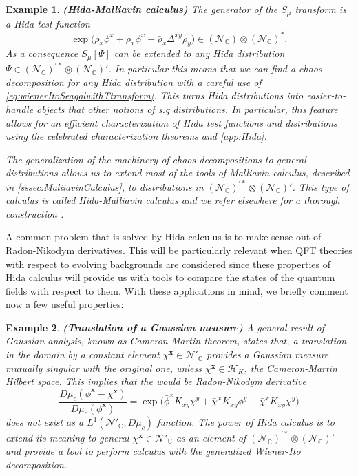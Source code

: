 \documentclass{elsarticle}%
\newtheorem{example}{Example}%
\begin{document}
\begin{example}{\bf (Hida-Malliavin calculus)}
    \label{ex:HidaMalliavin}
    The generator of the $S_\mu$ transform is a Hida test function
    $$\exp{\big(\overline{{\rho}_x\phi^x}+{\rho_x{\phi}^x}-\bar\rho_x\Delta^{xy}\rho_y\big)}\in (\mathcal{N}_\mathbb{C})\otimes (\mathcal{N}_\mathbb{C})^*.$$  As a consequence $S_\mu[\Psi]$ can be extended  to any Hida distribution $\Psi\in(\mathcal{N}_{\mathbb{C}})^{\prime \ast}\otimes (\mathcal{N}_\mathbb{C})'$. In particular this means that we can find a chaos decomposition for any Hida distribution with a careful use of \eqref{eq:wienerItoSeagalwithTtransform}.  
    This turns Hida distributions into easier-to-handle objects that other notions of \textit{s.q} distributions. In particular, this feature allows for an efficient characterization of Hida test functions and distributions using the celebrated characterization theorems \cite{kondratievGeneralizedFunctionals1996,hidaWhiteNoise1993} and \ref{app:Hida}.  

    The generalization of the machinery of chaos decompositions to general distributions allows us to extend most of the tools of Malliavin calculus, described in \autoref{sssec:MaliiavinCalculus}, to distributions in $(\mathcal{N}_{\mathbb{C}})^{\prime \ast}\otimes (\mathcal{N}_\mathbb{C})'$. This type of calculus is called Hida-Malliavin calculus and we refer elsewhere for a thorough construction \cite{nunnoMalliavinCalculus2009,holdenStochasticPartial2010}.
\end{example}



A common problem that is solved by Hida calculus is to make sense out of Radon-Nikodym derivatives. This will be particularly relevant when QFT theories with respect to evolving backgrounds are considered since these properties of Hida calculus will provide us with tools to compare the states of the quantum fields with respect to them. With these applications in mind, we briefly comment now a few useful properties: 

\begin{example}{\bf (Translation of a Gaussian measure)}
    \label{ex:translations} A general result of Gaussian analysis, known as Cameron-Martin theorem, states that,  a translation in the domain by a constant element $\chi^\mathbf{x}\in \mathcal{N}'_\mathbb{C}$ provides a Gaussian measure mutually singular with the original  one, unless $\chi^\mathbf{x}\in \mathcal{H}_K$, the Cameron-Martin Hilbert space. This implies that the \textit{would be Radon-Nikodym derivative}
    $$\frac{D\mu_c(\phi^\mathbf{x}-\chi^\mathbf{x})}{D\mu_c(\phi^\mathbf{x})}=\exp{\big(\bar\phi^xK_{xy}\chi^y+\bar\chi^xK_{xy}\phi^y-\bar\chi^xK_{xy}\chi^y\big)}$$
does not exist as a $L^1(\mathcal{N}'_\mathbb{C},D\mu_c)$ function. The power of Hida calculus is to extend its meaning to general $\chi^\mathbf{x}\in \mathcal{N}'_\mathbb{C}$ as an element of $(\mathcal{N}_{\mathbb{C}})^{\prime *}\otimes (\mathcal{N}_\mathbb{C})'$ and provide a tool to perform  calculus with the generalized Wiener-Ito decomposition. 
\end{example}
 
\end{document}
